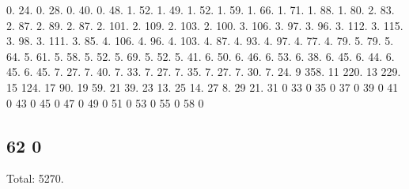 0. 24. 0. 28. 0. 40. 0. 48. 1. 52. 1. 49. 1. 52. 1. 59. 1. 66. 1. 71. 1. 88. 1. 80. 2. 83. 2. 87. 2. 89. 2. 87. 2. 101. 2. 109. 2. 103. 2. 100. 3. 106. 3. 97. 3. 96. 3. 112. 3. 115. 3. 98. 3. 111. 3. 85. 4. 106. 4. 96. 4. 103. 4. 87. 4. 93. 4. 97. 4. 77. 4. 79. 5. 79. 5. 64. 5. 61. 5. 58. 5. 52. 5. 69. 5. 52. 5. 41. 6. 50. 6. 46. 6. 53. 6. 38. 6. 45. 6. 44. 6. 45. 6. 45. 7. 27. 7. 40. 7. 33. 7. 27. 7. 35. 7. 27. 7. 30. 7. 24. 9 358. 11 220. 13 229. 15 124. 17 90. 19 59. 21 39. 23 13. 25 14. 27 8. 29 21. 31 0 33 0 35 0 37 0 39 0 41 0 43 0 45 0 47 0 49 0 51 0 53 0 55 0 58 0 \subsection*{62 0 }

Total\+: 5270. 
